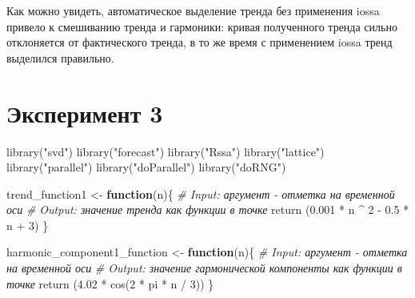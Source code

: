 \documentclass[specialist,
               substylefile = spbu_report.rtx,
               subf,href,colorlinks=true, 12pt]{disser}
\theoremstyle{definition}
\newenvironment{Shaded}{\begin{snugshade}}{\end{snugshade}}
\newcommand{\CommentTok}[1]{\textcolor[rgb]{0.56,0.35,0.01}{\textit{#1}}}
\newcommand{\ControlFlowTok}[1]{\textcolor[rgb]{0.13,0.29,0.53}{\textbf{#1}}}
\newcommand{\DecValTok}[1]{\textcolor[rgb]{0.00,0.00,0.81}{#1}}
\newcommand{\FloatTok}[1]{\textcolor[rgb]{0.00,0.00,0.81}{#1}}
\newcommand{\FunctionTok}[1]{\textcolor[rgb]{0.00,0.00,0.00}{#1}}
\newcommand{\NormalTok}[1]{#1}
\newcommand{\OtherTok}[1]{\textcolor[rgb]{0.56,0.35,0.01}{#1}}
\newcommand{\SpecialCharTok}[1]{\textcolor[rgb]{0.00,0.00,0.00}{#1}}
\newcommand{\StringTok}[1]{\textcolor[rgb]{0.31,0.60,0.02}{#1}}
\begin{document}
Как можно увидеть, автоматическое выделение тренда без применения iossa
привело к смешиванию тренда и гармоники: кривая полученного тренда
сильно отклоняется от фактического тренда, в то же время с применением
iossa тренд выделился правильно.

\section{Эксперимент 3}
\begin{Shaded}
\begin{Highlighting}[]
  \FunctionTok{library}\NormalTok{(}\StringTok{"svd"}\NormalTok{)}
  \FunctionTok{library}\NormalTok{(}\StringTok{"forecast"}\NormalTok{)}
  \FunctionTok{library}\NormalTok{(}\StringTok{"Rssa"}\NormalTok{)}
  \FunctionTok{library}\NormalTok{(}\StringTok{"lattice"}\NormalTok{)}
  \FunctionTok{library}\NormalTok{(}\StringTok{"parallel"}\NormalTok{)}
  \FunctionTok{library}\NormalTok{(}\StringTok{"doParallel"}\NormalTok{)}
  \FunctionTok{library}\NormalTok{(}\StringTok{"doRNG"}\NormalTok{)}
\end{Highlighting}
\end{Shaded}

\begin{Shaded}
\begin{Highlighting}[]
\NormalTok{    trend\_function1 }\OtherTok{\textless{}{-}} \ControlFlowTok{function}\NormalTok{(n)\{}
      \CommentTok{\# Input: аргумент {-} отметка на временной оси}
      \CommentTok{\# Output: значение тренда как функции в точке}
      \FunctionTok{return}\NormalTok{ (}\FloatTok{0.001} \SpecialCharTok{*}\NormalTok{ n }\SpecialCharTok{\^{}} \DecValTok{2} \SpecialCharTok{{-}} \FloatTok{0.5} \SpecialCharTok{*}\NormalTok{ n }\SpecialCharTok{+} \DecValTok{3}\NormalTok{)}
\NormalTok{    \}}
\end{Highlighting}
\end{Shaded}

\begin{Shaded}
\begin{Highlighting}[]
\NormalTok{  harmonic\_component1\_function }\OtherTok{\textless{}{-}} \ControlFlowTok{function}\NormalTok{(n)\{}
    \CommentTok{\# Input: аргумент {-} отметка на временной оси}
    \CommentTok{\# Output: значение гармонической компоненты как функции в точке}
    \FunctionTok{return}\NormalTok{ (}\FloatTok{4.02} \SpecialCharTok{*} \FunctionTok{cos}\NormalTok{(}\DecValTok{2} \SpecialCharTok{*}\NormalTok{ pi }\SpecialCharTok{*}\NormalTok{ n }\SpecialCharTok{/} \DecValTok{3}\NormalTok{))}
\NormalTok{  \}}
\end{Highlighting}
\end{Shaded}
\end{document}
